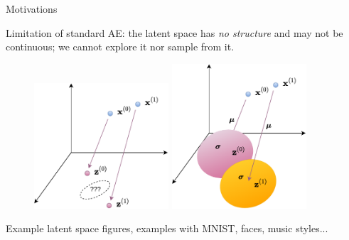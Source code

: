 \documentclass{beamer}
\begin{document}
  \begin{frame}{Motivations}
    
    Limitation of standard AE: the latent space has \emph{no structure} and may not be continuous; we cannot explore it nor sample from it.

    \begin{figure}
      \includegraphics[width=5cm]{rc/ae-latent}
      \includegraphics[width=5cm]{rc/vae-latent}
    \end{figure}

    Example latent space figures, examples with MNIST, faces, music styles...

  \end{frame}
\end{document}

